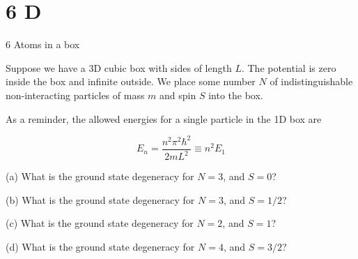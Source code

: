 \documentclass{article}
\begin{document}
\newpage

\section*{6 D }
\begin{ques}
6 Atoms in a box

Suppose we have a 3D cubic box with sides of length $L$. The potential is zero inside the
box and infinite outside. We place some number $N$ of indistinguishable non-interacting
particles of mass $m$ and spin $S$ into the box.

As a reminder, the allowed energies for a single particle in the 1D box are

\[
E_n = \frac{n^2 \pi^2 \hbar^2}{2mL^2} \equiv n^2 E_1
\]

(a) What is the ground state degeneracy for $N = 3$, and $S = 0$?

(b) What is the ground state degeneracy for $N = 3$, and $S = 1/2$?

(c) What is the ground state degeneracy for $N = 2$, and $S = 1$?

(d) What is the ground state degeneracy for $N = 4$, and $S = 3/2$?
\end{ques}
\end{document}
